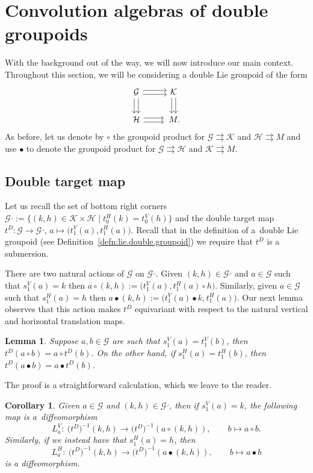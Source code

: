 \documentclass[10pt,a4paper]{amsart}
\numberwithin{equation}{section}
\newtheorem{Corollary}[Theorem]{Corollary}
\newtheorem{Lemma}[Theorem]{Lemma}
\theoremstyle{definition}
\newcommand{\CG}{\mathcal{G}}
\newcommand{\CH}{\mathcal{H}}
\newcommand{\CK}{\mathcal{K}}
\newcommand{\inv}{^{-1}}
\newcommand{\darrow}{\arrow[d, shift right] \arrow[d, shift left]}
\newcommand{\rarrow}{\arrow[r, shift right] \arrow[r, shift left]}
\newcommand{\grpd}{\rightrightarrows}
\begin{document}
\section{Convolution algebras of double groupoids}\label{sec5}
With the background out of the way, we will now introduce our main context. Throughout this section, we will be considering a double Lie groupoid of the form
 \begin{equation*}\label{eqn:haar.system.double.groupoid}
  \begin{tikzcd}
\CG \darrow \rarrow & \CK \darrow \\
\CH \rarrow &\, M.
\end{tikzcd}
\end{equation*}
As before, let us denote by $ \circ $ the groupoid product for $ \CG \grpd \CK $ and $ \CH \grpd M $ and use $ \bullet $ to denote the groupoid product for $ \CG \grpd \CH $ and $ \CK \grpd M $.
\subsection{Double target map}
Let us recall the set of bottom right corners
$\CG^\lrcorner := \big\{ (k,h) \in \CK \times \CH \mid t^H_0(k) = t^V_0(h) \big\}$
and the double target map
$t^D \colon \CG \to \CG^\lrcorner$, $a \mapsto \big(t_1^V(a), t_1^H(a)\big)$.
Recall that in the definition of a~double Lie groupoid (see Definition~\ref{defn:lie.double.groupoid}) we require that $ t^D $ is a submersion.

There are two natural actions of $ \CG $ on $ \CG^\lrcorner$. Given $ (k,h) \in \CG^\lrcorner $ and $ a \in \CG $ such that $ s^V_1(a) = k $ then
$a \circ (k,h) := \big( t^V_1(a), t^H_1(a) \circ h\big)$.
Similarly, given $ a \in \CG $ such that $ s^H_1(a) = h $ then
$a \bullet (k,h) := \big( t^V_1(a) \bullet k, t^H_1(a)\big)$.
Our next lemma observes that this action makes $ t^D $ equivariant with respect to the natural vertical and horizontal translation maps.

\begin{Lemma}
  Suppose $ a, b \in \CG $ are such that $ s^V_1(a) = t^V_1(b) $, then
  $t^D(a \circ b) = a \circ t^D(b) $.
  On the other hand, if $ s^H_1(a) = t^H_1(b)$, then
  $t^D(a \bullet b) = a \bullet t^D(b)$.
\end{Lemma}
The proof is a straightforward calculation, which we leave to the reader.
\begin{Corollary}
  Given $ a \in \CG $ and $ (k,h) \in \CG^\lrcorner $, then if $ s^V_1(a) = k $, the following map is a~diffeomorphism
  \[ L^V_a \colon \ \big(t^D\big)\inv(k,h) \to \big(t^D\big)\inv( a \circ (k,h)), \qquad b \mapsto a \circ b. \]
  Similarly, if we instead have that $ s^H_1(a) = h $, then
  \[ L^H_a \colon \ \big(t^D\big)\inv(k,h) \to \big(t^D\big)\inv( a \bullet (k,h)), \qquad b \mapsto a \bullet b \]
  is a diffeomorphism.
\end{Corollary}
\end{document}
